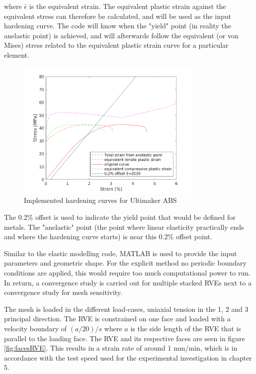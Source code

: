 \noindent where $\bar\epsilon$ is the equivalent strain. The equivalent plastic strain against the equivalent stress can therefore be calculated, and will be used as the input hardening curve. The code will know when the "yield" point (in reality the anelastic point) is achieved, and will afterwards follow the equivalent (or von Mises) stress related to the equivalent plastic strain curve for a particular element. 


\begin{figure}[htb]
    \centering
    \includegraphics[width=0.80\textwidth]{chapter_7_non-elasticmodelling/figures/Hardening.png}
    \caption{Implemented hardening curves for Ultimaker ABS}
    \label{fig:hardening}
\end{figure}

The 0.2\% offset is used to indicate the yield point that would be defined for metals. The "anelastic" point (the point where linear elasticity practically ends and  where the hardening curve starts) is near this 0.2\% offset point. 

Similar to the elastic modelling code, MATLAB is used to provide the input parameters and geometric shape. For the explicit method no periodic boundary conditions are applied, this would require too much computational power to run. In return, a convergence study is carried out for multiple stacked RVEs next to a convergence study for mesh sensitivity. 

The mesh is loaded in the different load-cases, uniaxial tension in the 1, 2 and 3 principal direction. The RVE is constrained on one face and loaded with a velocity boundary of $(a/20)/s$ where $a$ is the side length of the RVE that is parallel to the loading face. The RVE and its respective faces are seen in figure \ref{fig:facesRVE}. This results in a strain rate of around 1 mm/min, which is in accordance with the test speed used for the experimental investigation in chapter 5.

